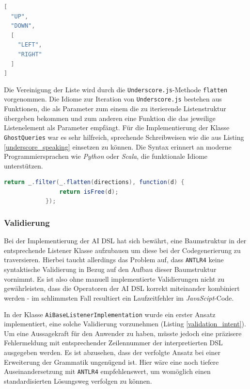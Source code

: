 \documentclass[conference]{IEEEtran}
\begin{document}
\begin{lstlisting}[language=Java, captionpos=b, caption=Beispiel einer verschachtelten Datenstruktur als directions-Parameter von \texttt{randomWithDistributions()}, label=rwd_example]
[
  "UP",
  "DOWN",
  [
    "LEFT",
    "RIGHT"
  ]
]
\end{lstlisting}


Die Vereinigung der Liste wird durch die \texttt{Underscore.js}-Methode \texttt{flatten} vorgenommen. Die Idiome zur Iteration von \texttt{Underscore.js} bestehen aus Funktionen,
die als Parameter zum einem die zu iterierende Listenstruktur übergeben bekommen und zum anderen eine Funktion die das jeweilige Listenelement
als Parameter empfängt. Für die Implementierung der Klasse \texttt{GhostQueries} war es sehr hilfreich, sprechende Schreibweisen wie die aus Listing \ref{underscore_speaking} einsetzen zu können. Die Syntax erinnert an moderne Programmiersprachen wie \emph{Python} oder \emph{Scala}, die funktionale Idiome unterstützen.

\begin{lstlisting}[language=Java, captionpos=b, caption=Implementierung der \texttt{Filter-Free}-Methode mit Hilfe von funktionalen Hilfsmitteln von \texttt{Underscore.js}, label=underscore_speaking]
return _.filter(_.flatten(directions), function(d) {
                return isFree(d);
            });
\end{lstlisting}

\subsubsection{Validierung}
\label{valid}

Bei der Implementierung der AI DSL hat sich bewährt, eine Baumstruktur in der entsprechende Listener Klasse aufzubauen um diese bei der Codegenerierung zu traversieren. Hierbei taucht allerdings das Problem auf, dass \texttt{ANTLR4} keine syntaktische Validierung in Bezug auf den Aufbau dieser Baumstruktur vornimmt. Es ist also ohne manuell implementierte Validierungen nicht zu gewährleisten, dass die Operatoren der AI DSL korrekt miteinander kombiniert werden - im schlimmsten Fall resultiert ein Laufzeitfehler im \emph{JavaScipt}-Code.

In der Klasse \texttt{AiBaseListenerImplementation} wurde ein erster Ansatz implementiert, eine solche Validierung vorzunehmen (Listing \ref{validation_intent}). Um eine Aussagekraft für den Anwender zu haben, müsste jedoch eine präzisere Fehlermeldung mit entsprechender Zeilennummer der interpretierten DSL ausgegeben werden. Es ist abzusehen, dass der verfolgte Ansatz bei einer Erweiterung der Grammatik ungenügend ist. Hier wäre eine noch tiefere Auseinandersetzung mit \texttt{ANTLR4} empfehlenswert, um womöglich einen standardisierten Lösungsweg verfolgen zu können.
\end{document}
